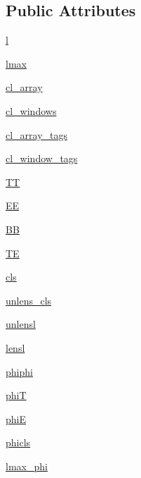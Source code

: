 \subsection*{Public Attributes}
\begin{DoxyCompactItemize}
\item 
\mbox{\hyperlink{classcambPlots_1_1ClResult_af3e0a2323ae6b66efe59e745282ce988}{l}}
\item 
\mbox{\hyperlink{classcambPlots_1_1ClResult_a6ddd30c811f5ce588146457cd12f8d8c}{lmax}}
\item 
\mbox{\hyperlink{classcambPlots_1_1ClResult_a47706b8004a10920546cd73bfd8f6e16}{cl\+\_\+array}}
\item 
\mbox{\hyperlink{classcambPlots_1_1ClResult_a308567a3eac1fd180f834ef9370a082a}{cl\+\_\+windows}}
\item 
\mbox{\hyperlink{classcambPlots_1_1ClResult_a0960cff48b1e4fd5ae4b6e2d9d6f3678}{cl\+\_\+array\+\_\+tags}}
\item 
\mbox{\hyperlink{classcambPlots_1_1ClResult_a8fbb31dfa059c4589f6fabca6ee6940b}{cl\+\_\+window\+\_\+tags}}
\item 
\mbox{\hyperlink{classcambPlots_1_1ClResult_ac634df087ab7f5739dd8409c61917b2b}{TT}}
\item 
\mbox{\hyperlink{classcambPlots_1_1ClResult_a40fcc3dbb4af959f9e5c67bf4be585b0}{EE}}
\item 
\mbox{\hyperlink{classcambPlots_1_1ClResult_a251fe419fc5bca0d5c9129334c182a69}{BB}}
\item 
\mbox{\hyperlink{classcambPlots_1_1ClResult_ac15a687fc89d7371f629389e1c8bb789}{TE}}
\item 
\mbox{\hyperlink{classcambPlots_1_1ClResult_a1130fb7a6b0037b67afd200bf2041caf}{cls}}
\item 
\mbox{\hyperlink{classcambPlots_1_1ClResult_a92247b55f2ab474b5530ca31cf14e87a}{unlens\+\_\+cls}}
\item 
\mbox{\hyperlink{classcambPlots_1_1ClResult_a26f5fe3e5d89f227f5e35e02e5413dde}{unlensl}}
\item 
\mbox{\hyperlink{classcambPlots_1_1ClResult_a2c64a24f7ae6291999f471a8392f3f2c}{lensl}}
\item 
\mbox{\hyperlink{classcambPlots_1_1ClResult_af48ff62bf2e76d3b40e900ea63edd65e}{phiphi}}
\item 
\mbox{\hyperlink{classcambPlots_1_1ClResult_a1c0c7cca869f7a913f2360f8d5fbdbf5}{phiT}}
\item 
\mbox{\hyperlink{classcambPlots_1_1ClResult_a517850476069c3a06f3264f0fdd1171f}{phiE}}
\item 
\mbox{\hyperlink{classcambPlots_1_1ClResult_ae40df8a542e2f57681f9a3941778f4f4}{phicls}}
\item 
\mbox{\hyperlink{classcambPlots_1_1ClResult_ad7d35cfef5f000c8daaa745daf71b11b}{lmax\+\_\+phi}}
\end{DoxyCompactItemize}



